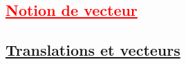 \documentclass[11pt,a4paper]{article}
\begin{document}
\setlength\parindent{0mm}
\renewcommand \footrulewidth{.2pt}
\pagestyle{fancy}
\thispagestyle{empty}

~~\vspace{-2cm}

\begin{center}  \end{center}

~\vspace{-0.8cm}

\textcolor{red}{\section{\underline{Notion de vecteur}}}

\subsection{\textcolor{vert}{\underline{Translations et vecteurs}}}

~\vspace{-1.3cm}
\end{document}
